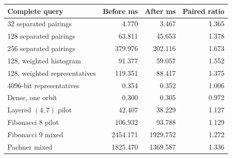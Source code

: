 \begin{tabular}{lrrr}
\toprule
Complete query & Before ms & After ms & Paired ratio\\
\midrule
32 separated pairings & 4.770 & 3.467 & 1.365\\
128 separated pairings & 63.811 & 45.653 & 1.378\\
256 separated pairings & 379.976 & 202.116 & 1.673\\
128, weighted histogram & 91.377 & 59.057 & 1.552\\
128, weighted representatives & 119.351 & 88.417 & 1.375\\
4096-bit representatives & 0.354 & 0.352 & 1.006\\
Dense, one orbit & 0.300 & 0.305 & 0.972\\
Layered $(4,7)$ pilot & 42.407 & 38.229 & 1.127\\
Fibonacci 8 pilot & 106.932 & 93.788 & 1.129\\
Fibonacci 9 mixed & 2454.171 & 1929.752 & 1.272\\
Pachner mixed & 1825.470 & 1369.587 & 1.336\\
\bottomrule
\end{tabular}
